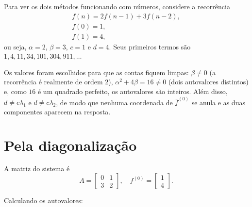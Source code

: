 
Para ver os dois métodos funcionando com números, considere a recorrência
\begin{align*}
  f(n) = 2 f(n-1) + 3 f(n-2), \\
  f(0) = 1, \\
  f(1) = 4,
\end{align*}
ou seja, $\alpha = 2$, $\beta = 3$, $c = 1$ e $d = 4$. Seus primeiros termos são $1, 4, 11, 34, 101, 304, 911, \dots$

Os valores foram escolhidos para que as contas fiquem limpas: $\beta \neq 0$ (a recorrência é realmente de ordem 2), $\alpha^2 + 4\beta = 16 \neq 0$ (dois autovalores distintos) e, como $16$ é um quadrado perfeito, os autovalores são inteiros. Além disso, $d \neq c \lambda_1$ e $d \neq c \lambda_2$, de modo que nenhuma coordenada de $\bar{f}^{(0)}$ se anula e as duas componentes aparecem na resposta.

\section{Pela diagonalização}

A matriz do sistema é
\[
  A =
  \begin{bmatrix}
    0 & 1 \\
    3 & 2
  \end{bmatrix},
  \quad
  f^{(0)} =
  \begin{bmatrix}
    1 \\
    4
  \end{bmatrix}.
\]

Calculando os autovalores:
\begin{calcproof}[.]
\end{calcproof}

